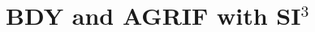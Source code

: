 \documentclass[../../tex_main/NEMO_manual]{subfiles}
\begin{document}

\chapter{BDY and AGRIF with SI$^3$}
\label{chap:REG}
\minitoc

\newpage
$\ $\newline    %
\end{document}
